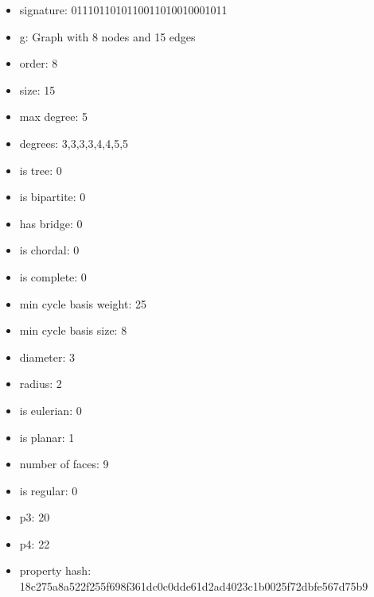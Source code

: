 \begin{itemize}
\item signature: 0111011010110011010010001011
\item g: Graph with 8 nodes and 15 edges
\item order: 8
\item size: 15
\item max degree: 5
\item degrees: 3,3,3,3,4,4,5,5
\item is tree: 0
\item is bipartite: 0
\item has bridge: 0
\item is chordal: 0
\item is complete: 0
\item min cycle basis weight: 25
\item min cycle basis size: 8
\item diameter: 3
\item radius: 2
\item is eulerian: 0
\item is planar: 1
\item number of faces: 9
\item is regular: 0
\item p3: 20
\item p4: 22
\item property hash: 18c275a8a522f255f698f361dc0c0dde61d2ad4023c1b0025f72dbfe567d75b9
\end{itemize}
\newpage
\begin{figure}
\end{figure}

